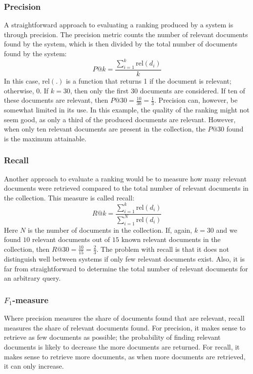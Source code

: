 \subsubsection{Precision}
A straightforward approach to evaluating a ranking produced by a system is through precision. The precision metric counts the number of relevant documents found by the system, which is then divided by the total number of documents found by the system:
\begin{equation}
	\textit{P}@k = \frac{\sum_{i=1}^k\text{rel}\left(d_i\right)}{k}
\end{equation}
In this case, $\text{rel}(.)$ is a function that returns 1 if the document is relevant; otherwise, 0.
If $k=30$, then only the first $30$ documents are considered. If ten of these documents are relevant, then $P@30 = \frac{10}{30} = \frac{1}{3}$. Precision can, however, be somewhat limited in its use. In this example, the quality of the ranking might not seem good, as only a third of the produced documents are relevant. However, when only ten relevant documents are present in the collection, the $P@30$ found is the maximum attainable.  

\subsubsection{Recall}
Another approach to evaluate a ranking would be to measure how many relevant documents were retrieved compared to the total number of relevant documents in the collection. This measure is called recall: 
\begin{equation}
	\textit{R}@k = \frac{\sum_{i=1}^k\text{rel}\left(d_i\right)}{\sum_{i=1}^N\text{rel}\left(d_i\right)}
\end{equation}
Here $N$ is the number of documents in the collection. If, again, $k=30$ and we found $10$ relevant documents out of $15$ known relevant documents in the collection, then $R@30 = \frac{10}{15} = \frac{2}{3}$. The problem with recall is that it does not distinguish well between systems if only few relevant documents exist. Also, it is far from straightforward to determine the total number of relevant documents for an arbitrary query.

\subsubsection{$F_1$-measure}
Where precision measures the share of documents found that are relevant, recall measures the share of relevant documents found. For precision, it makes sense to retrieve as few documents as possible; the probability of finding relevant documents is likely to decrease the more documents are returned. For recall, it makes sense to retrieve more documents, as when more documents are retrieved, it can only increase.  

